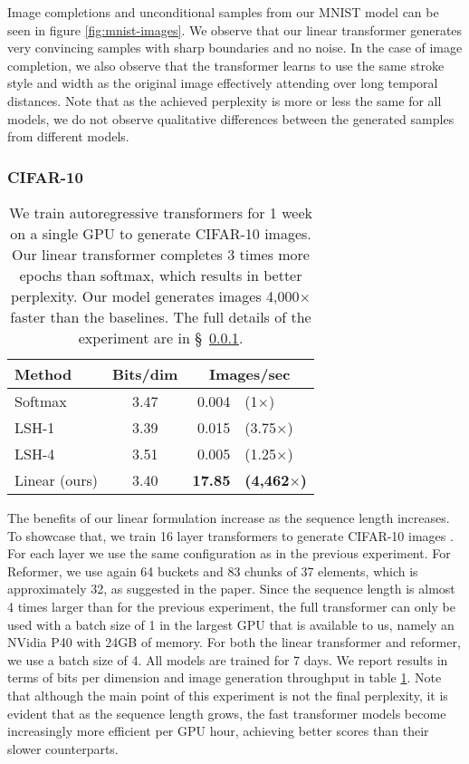 \documentclass{article}
\begin{document}
Image completions and unconditional samples from our MNIST model can be seen in
figure \ref{fig:mnist-images}. We observe that our linear transformer generates
very convincing samples with sharp boundaries and no noise. In the
case of image completion, we also observe that the transformer learns to use
the same stroke style and width as the original image effectively attending
over long temporal distances. Note that as the achieved perplexity is more or
less the same for all models, we do not observe qualitative differences between
the generated samples from different models.

\subsubsection{CIFAR-10} \label{sec:exp-cifar}

\bgroup
\renewcommand{\arraystretch}{1.1}
\begin{table}
    \begin{center}
    \begin{tabular}{lcrl}
        Method & Bits/dim & \multicolumn{2}{c}{Images/sec} \\
        \hline
        Softmax & 3.47 & 0.004 & (1$\times$) \\
        LSH-1 & 3.39 & 0.015  & (3.75$\times$) \\
        LSH-4 & 3.51 & 0.005  & (1.25$\times$) \\
        \hline
        Linear (ours) & 3.40 & \textbf{17.85} & \textbf{(4,462$\times$)}
    \end{tabular}
    \end{center}
    \caption{We train autoregressive transformers for 1 week on a single GPU to
             generate CIFAR-10 images. Our linear transformer completes 3 times
             more epochs than softmax, which results in better perplexity. Our model
             generates images 4,000$\times$ faster than the baselines. The
             full details of the experiment are in \S~\ref{sec:exp-cifar}.}
    \label{tab:cifar10}
\end{table}
\egroup

The benefits of our linear formulation increase as the sequence length increases.
To showcase that, we train 16 layer transformers to generate
CIFAR-10 images \cite{krizhevsky2009learning}. For each layer we use the same
configuration as in the previous experiment. For Reformer, we use again 64
buckets and 83 chunks of 37 elements, which is approximately 32, as suggested in
the paper. Since the sequence length is almost 4 times larger than for the
previous experiment, the full transformer can only be used with a batch size of 1
in the largest GPU that is available to us, namely an NVidia P40 with 24GB of
memory. For both the linear transformer and reformer, we use a batch size
of 4. All models are trained for 7 days. We report results in terms of
bits per dimension and image generation throughput in table \ref{tab:cifar10}.
Note that although the main point of this experiment is not the final
perplexity, it is evident that as the sequence length grows, the fast
transformer models become increasingly more efficient per GPU hour, achieving
better scores than their slower counterparts.
\end{document}

